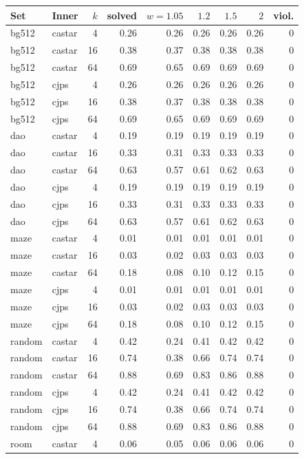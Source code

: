 \begin{tabular}{llr r rrrr r}\toprule
Set & Inner & $k$ & solved & $w{=}1.05$ & $1.2$ & $1.5$ & $2$ & viol.\\\midrule
bg512 & castar & 4 & 0.26 & 0.26 & 0.26 & 0.26 & 0.26 & 0\\
bg512 & castar & 16 & 0.38 & 0.37 & 0.38 & 0.38 & 0.38 & 0\\
bg512 & castar & 64 & 0.69 & 0.65 & 0.69 & 0.69 & 0.69 & 0\\
bg512 & cjps & 4 & 0.26 & 0.26 & 0.26 & 0.26 & 0.26 & 0\\
bg512 & cjps & 16 & 0.38 & 0.37 & 0.38 & 0.38 & 0.38 & 0\\
bg512 & cjps & 64 & 0.69 & 0.65 & 0.69 & 0.69 & 0.69 & 0\\
dao & castar & 4 & 0.19 & 0.19 & 0.19 & 0.19 & 0.19 & 0\\
dao & castar & 16 & 0.33 & 0.31 & 0.33 & 0.33 & 0.33 & 0\\
dao & castar & 64 & 0.63 & 0.57 & 0.61 & 0.62 & 0.63 & 0\\
dao & cjps & 4 & 0.19 & 0.19 & 0.19 & 0.19 & 0.19 & 0\\
dao & cjps & 16 & 0.33 & 0.31 & 0.33 & 0.33 & 0.33 & 0\\
dao & cjps & 64 & 0.63 & 0.57 & 0.61 & 0.62 & 0.63 & 0\\
maze & castar & 4 & 0.01 & 0.01 & 0.01 & 0.01 & 0.01 & 0\\
maze & castar & 16 & 0.03 & 0.02 & 0.03 & 0.03 & 0.03 & 0\\
maze & castar & 64 & 0.18 & 0.08 & 0.10 & 0.12 & 0.15 & 0\\
maze & cjps & 4 & 0.01 & 0.01 & 0.01 & 0.01 & 0.01 & 0\\
maze & cjps & 16 & 0.03 & 0.02 & 0.03 & 0.03 & 0.03 & 0\\
maze & cjps & 64 & 0.18 & 0.08 & 0.10 & 0.12 & 0.15 & 0\\
random & castar & 4 & 0.42 & 0.24 & 0.41 & 0.42 & 0.42 & 0\\
random & castar & 16 & 0.74 & 0.38 & 0.66 & 0.74 & 0.74 & 0\\
random & castar & 64 & 0.88 & 0.69 & 0.83 & 0.86 & 0.88 & 0\\
random & cjps & 4 & 0.42 & 0.24 & 0.41 & 0.42 & 0.42 & 0\\
random & cjps & 16 & 0.74 & 0.38 & 0.66 & 0.74 & 0.74 & 0\\
random & cjps & 64 & 0.88 & 0.69 & 0.83 & 0.86 & 0.88 & 0\\
room & castar & 4 & 0.06 & 0.05 & 0.06 & 0.06 & 0.06 & 0\\

\end{tabular}
